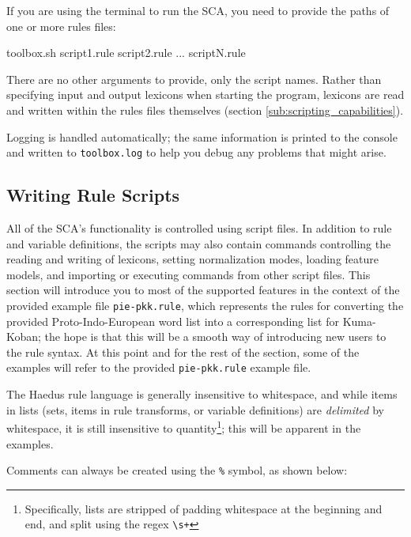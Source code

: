 \documentclass[10pt,letterpaper]{article}
\newcounter{excounter}
\newenvironment{vex}[1]{
  \vspace{1em}
  \refstepcounter{excounter}
  \noindent\makebox[3em][l]{(\arabic{excounter}\label{#1})}
  \minipage{\textwidth}
  \verbatim
}{
  \endverbatim
  \endminipage
  \vspace{1em}
}
\begin{document}
If you are using the terminal to run the SCA, you need to provide the paths of one or more rules files:

\begin{vex}{ex:runstandard}
toolbox.sh script1.rule script2.rule ... scriptN.rule
\end{vex}

\noindent
There are no other arguments to provide, only the script names. Rather than specifying input and output lexicons when starting the program, lexicons are read and written within the rules files themselves (section \ref{sub:scripting_capabilities}).

Logging is handled automatically; the same information is printed to the console and written to \texttt{toolbox.log} to help you debug any problems that might arise.


\subsection{Writing Rule Scripts}
\label{sub:writing_rule_scripts}
All of the SCA's functionality is controlled using script files. In addition to rule and variable definitions, the scripts may also contain commands controlling the reading and writing of lexicons, setting normalization modes, loading feature models, and importing or executing commands from other script files. This section will introduce you to most of the supported features in the context of the provided example file \texttt{pie-pkk.rule}, which represents the rules for converting the provided Proto-Indo-European word list into a corresponding list for Kuma-Koban; the hope is that this will be a smooth way of introducing new users to the rule syntax. At this point and for the rest of the section, some of the examples will refer to the provided \texttt{pie-pkk.rule} example file.

The Haedus rule language is generally insensitive to whitespace, and while items in lists (sets, items in rule transforms, or variable definitions) are \emph{delimited} by whitespace, it is still insensitive to quantity\footnote{Specifically, lists are stripped of padding whitespace at the beginning and end, and split using the regex \texttt{\textbackslash\hspace{0pt}s+}}; this will be apparent in the examples. 

Comments can always be created using the \texttt{\%} symbol, as shown below:
\end{document}
